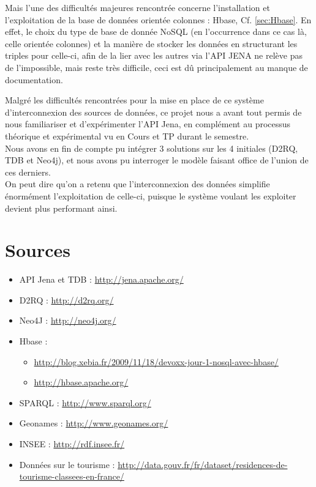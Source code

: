 \documentclass{article}
\begin{document}
Mais l'une des difficultés majeures rencontrée concerne l'installation et l'exploitation de la base de données orientée colonnes : Hbase, Cf. \ref{sec:Hbase}.
En effet, le choix du type de base de donnée NoSQL (en l'occurrence dans ce cas là, celle orientée colonnes) et la manière de stocker les données en structurant les triples pour celle-ci,  afin de la lier avec les autres via l'API JENA ne relève pas de l'impossible, mais reste très difficile, ceci est dû principalement au manque de documentation.

Malgré les difficultés rencontrées pour la mise en place de ce système d'interconnexion des sources de données, ce projet nous a avant tout permis de nous familiariser et d'expérimenter l'API Jena, en complément au processus théorique et expérimental vu en Cours et TP durant le semestre.\\
Nous avons en fin de compte pu intégrer 3 solutions sur les 4 initiales (D2RQ, TDB et Neo4j), et nous avons pu interroger le modèle faisant office de l'union de ces derniers.\\
On peut dire qu'on a retenu que l'interconnexion des données simplifie énormément l'exploitation de celle-ci, puisque le système voulant les exploiter devient plus performant ainsi.

\newpage
\section{Sources}
\begin{itemize}
\item API Jena et TDB : \href{http://jena.apache.org/}{http://jena.apache.org/}
 \\
\item D2RQ : \href{http://d2rq.org/}{http://d2rq.org/}
\\
\item Neo4J : \href{http://neo4j.org/}{http://neo4j.org/}
\\
\item Hbase :\label{sec:shbase}
\begin{itemize}
\item \href{http://blog.xebia.fr/2009/11/18/devoxx-jour-1-nosql-avec-hbase/}{http://blog.xebia.fr/2009/11/18/devoxx-jour-1-nosql-avec-hbase/}
 \item \href{http://hbase.apache.org/}{http://hbase.apache.org/}
\end{itemize}

\item SPARQL : \href{http://www.sparql.org/}{http://www.sparql.org/}
\\
\item Geonames : \href{http://www.geonames.org/}{http://www.geonames.org/}
\\
\item INSEE : \href{http://rdf.insee.fr/}{http://rdf.insee.fr/}
\\
\item Données sur le tourisme : \href{http://data.gouv.fr/fr/dataset/residences-de-tourisme-classees-en-france/}{http://data.gouv.fr/fr/dataset/residences-de-tourisme-classees-en-france/}

\end{itemize}

\end{document}

